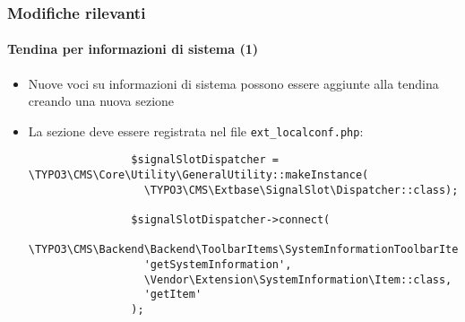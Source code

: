 \begin{frame}[fragile]
	\frametitle{Modifiche rilevanti}
	\framesubtitle{Tendina per informazioni di sistema (1)}

	\lstset{basicstyle=\tiny\ttfamily}

	\begin{itemize}
		\item Nuove voci su informazioni di sistema possono essere aggiunte alla tendina creando una nuova sezione

		\item La sezione deve essere registrata nel file \texttt{ext\_localconf.php}:

			\begin{lstlisting}
				$signalSlotDispatcher = \TYPO3\CMS\Core\Utility\GeneralUtility::makeInstance(
				  \TYPO3\CMS\Extbase\SignalSlot\Dispatcher::class);

				$signalSlotDispatcher->connect(
				  \TYPO3\CMS\Backend\Backend\ToolbarItems\SystemInformationToolbarItem::class,
				  'getSystemInformation',
				  \Vendor\Extension\SystemInformation\Item::class,
				  'getItem'
				);
			\end{lstlisting}

	\end{itemize}

\end{frame}

